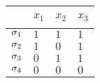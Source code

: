 \documentclass[preview]{standalone}
\begin{document}
\begin{tabular}{C{0.4cm}|C{0.4cm}C{0.4cm}C{0.4cm}}
	~	& $x_1$	& $x_2$	& $x_3$ \\ \midrule
	$\sigma_1$	& $1$		& $1$	& $1$ \\
	$\sigma_2$	& $1$		& $0$	& $1$ \\
	$\sigma_3$	& $0$		& $1$	& $1$ \\
	$\sigma_4$	& $0$		& $0$	& $0$ \\ \bottomrule
\end{tabular}
\end{document}

